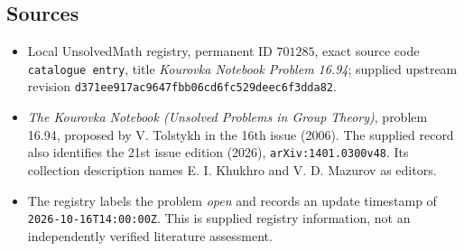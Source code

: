 \documentclass[11pt]{article}
\begin{document}
\subsection{Sources}
\begin{itemize}
\item Local UnsolvedMath registry, permanent ID \(701285\), exact source code \texttt{catalogue entry}, title \emph{Kourovka Notebook Problem 16.94}; supplied upstream revision \texttt{d371ee917ac9647fbb06cd6fc529deec6f3dda82}.
\item \emph{The Kourovka Notebook (Unsolved Problems in Group Theory)}, problem 16.94, proposed by V. Tolstykh in the 16th issue (2006). The supplied record also identifies the 21st issue edition (2026), \texttt{arXiv:1401.0300v48}. Its collection description names E. I. Khukhro and V. D. Mazurov as editors.
\item The registry labels the problem \emph{open} and records an update timestamp of \texttt{2026-10-16T14:00:00Z}. This is supplied registry information, not an independently verified literature assessment.
\end{itemize}
\end{document}
